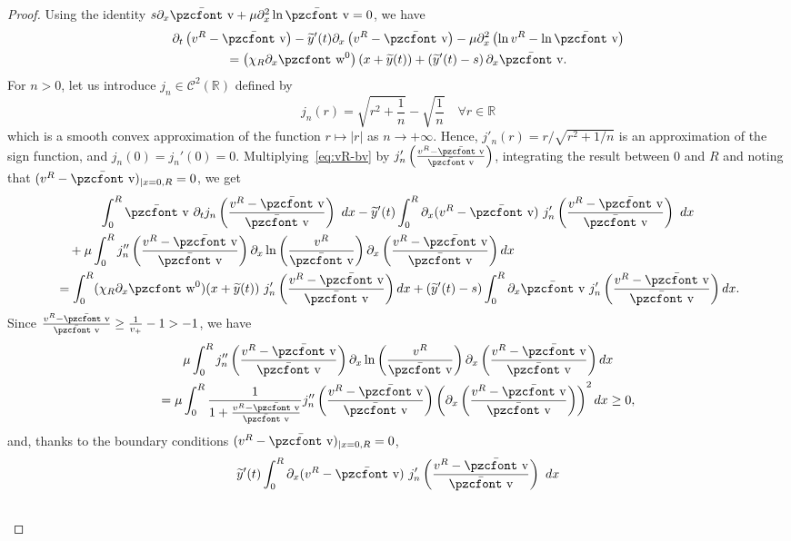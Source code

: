 \documentclass[10pt]{amsart}
\theoremstyle{definition}\newtheorem{defi}[theo]{Definition}\newtheorem{rema}[theo]{Remark}\newtheorem{exam}[theo]{Example}\newtheorem{exem}[theo]{Example}\newtheorem{nota}[theo]{Notation}
\newcommand{\mathpzc}[1]{\text{\pzcfont #1}}
\newcommand{\R}{\mathbb{R}}
\newcommand{\bv}{\bar{\mathpzc{v}}}
\newcommand{\cC}{\mathcal C}
\newcommand{\tw}{\mathpzc{w}}
\newcommand{\ty}{\widetilde{y}}
\let\oldforall\forall
\renewcommand*{\forall}{\mathrel{\oldforall}}
\begin{document}
\begin{proof}
Using the identity $s\partial_x \bv + \mu \partial^2_x \ln \bv = 0$, we have
\begin{multline}\label{eq:vR-bv}
\partial_t\left(v^R - \bv\right) - \ty'(t) \partial_x\left(v^R - \bv\right) - \mu \partial^2_x \left(\ln v^R - \ln \bv\right) \\
= \left(\chi_R\partial_x \tw^0\right)(x+\ty(t)) + \left(\ty'(t) -s\right) \partial_x \bv.
\end{multline}
For $n > 0$, let us introduce $j_n \in \cC^2(\R)$ defined by
\[	
j_n(r) = \sqrt{r^2 + \frac{1}{n}} - \sqrt{\frac{1}{n}} \quad \forall r \in \R
\]
which is a smooth convex approximation of the function $r \mapsto |r|$ as $n \to + \infty$. Hence, $j'_n(r) = r/\sqrt{r^2+ 1/n}$ is an approximation of the sign function, and $j_n(0)=j_n'(0)=0$. Multiplying~\eqref{eq:vR-bv} by $j'_n\left(\frac{v^R -\bv}{\bv}\right)$, integrating the result between $0$ and $R$ and noting that $(v^R-\bv)_{|x=0,R}=0$, we get
\begin{multline*}
\int_0^R \bv \ \partial_t j_n\left(\frac{v^R -\bv}{\bv}\right) \ dx - \ty'(t) \int_0^R \partial_x(v^R -\bv)\ j_n'\left(\frac{v^R -\bv}{\bv}\right) \ dx \\
\begin{aligned}
& \quad + \mu \int_0^R j_n''\left(\frac{v^R-\bv}{\bv}\right)\partial_x \ln\left(\frac{v^R}{\bv}\right) \partial_x\left(\frac{v^R -\bv}{\bv}\right)dx \\
& = \int_0^R (\chi_R\partial_x \tw^0)(x+\ty(t)) \ j'_n\left(\frac{v^R -\bv}{\bv}\right) dx + (\ty'(t) -s) \int_0^R \partial_x \bv \ j'_n\left(\frac{v^R -\bv}{\bv}\right) dx.
\end{aligned}
\end{multline*}
Since $\frac{v^R-\bv}{\bv} \geq \frac{1}{v_+} - 1 > -1$, we have
\begin{multline*}
\mu \int_0^R j_n''\left(\frac{v^R-\bv}{\bv}\right)\partial_x \ln\left(\frac{v^R}{\bv}\right) \partial_x\left(\frac{v^R -\bv}{\bv}\right)dx \\
 = \mu \int_0^R \dfrac{1}{1+\frac{v^R-\bv}{\bv}} j_n''\left(\frac{v^R-\bv}{\bv}\right)\left(\partial_x \left(\frac{v^R-\bv}{\bv}\right)\right)^2 dx
\geq 0,
\end{multline*}
and, thanks to the boundary conditions $(v^R-\bv)_{|x=0,R}=0$,
\begin{multline*}
 \ty'(t) \int_0^R \partial_x(v^R -\bv)\ j_n'\left(\frac{v^R -\bv}{\bv}\right) \ dx \\
\begin{aligned}

\end{aligned}
\end{multline*}
\end{proof}
\end{document}
